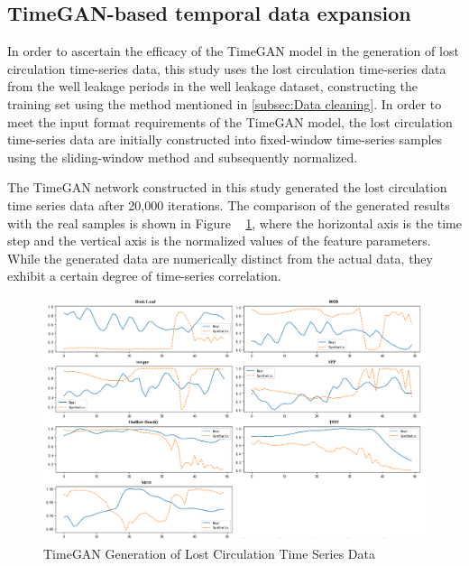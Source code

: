 \documentclass[journal,article,submit,pdftex,moreauthors]{Definitions/mdpi}
\begin{document}
\subsection{TimeGAN-based temporal data expansion}

In order to ascertain the efficacy of the TimeGAN model in the generation of lost circulation time-series data, this study uses the lost circulation time-series data from the well leakage periods in the well leakage dataset, constructing the training set using the method mentioned in \ref{subsec:Data cleaning}. In order to meet the input format requirements of the TimeGAN model, the lost circulation time-series data are initially constructed into fixed-window time-series samples using the sliding-window method and subsequently normalized. 

The TimeGAN network constructed in this study generated the lost circulation time series data after 20,000 iterations. The comparison of the generated results with the real samples is shown in Figure   \ref{fig:TimeGAN Generation of Lost Circulation Time Series Data}, where the horizontal axis is the time step and the vertical axis is the normalized values of the feature parameters. While the generated data are numerically distinct from the actual data, they exhibit a certain degree of time-series correlation. 

\begin{figure}[H]
    \centering
    \includegraphics[width=1\linewidth]{图片/timeGan数据生成.png}
    \caption{TimeGAN Generation of Lost Circulation Time Series Data}
    \label{fig:TimeGAN Generation of Lost Circulation Time Series Data}
\end{figure}
\end{document}
